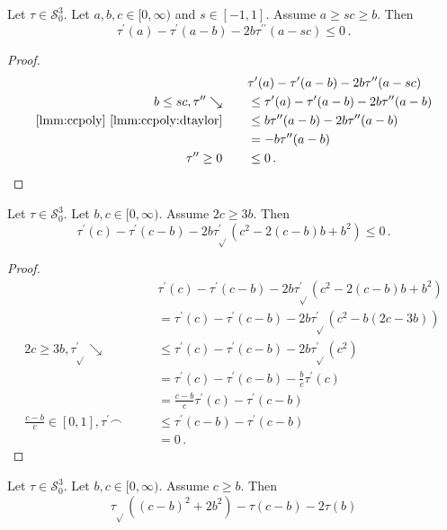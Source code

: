 \documentclass{article}
\newcommand*{\mc}[1]{\mathcal{#1}}
\newcommand{\Rp}{[0, \infty)} %
\newcommand{\pr}{^\prime}
\newcommand{\prr}{^{\prime\prime}}
\newcommand{\equationFullstop}{\, .}
\newcommand{\eqfs}{\equationFullstop}
\newcommand{\tran}{\tau}
\newcommand{\trans}{\tran_{\!\sqrt{}}}
\newcommand{\dtrans}{\trans\pr}
\newcommand{\dtran}{\tran\pr}
\newcommand{\ddtran}{\tran\prr}
\newcommand{\setccod}[1]{\mc S_0^{#1}}
\newcommand{\decr}{\searrow}
\newcommand{\posi}{\geq0}
\newcommand{\conc}{\smallfrown}
\begin{document}
\begin{appendix}
\begin{lemma}
	Let $\tran\in\setccod3$.
	Let $a,b,c\in\Rp$ and $s\in[-1,1]$.
	Assume $a \geq sc \geq b$.
	Then
	\begin{equation*}
		\dtran(a) - \dtran(a-b) - 2b \ddtran(a - sc)
		\leq
		0
		\eqfs
	\end{equation*}
\end{lemma}
%
\begin{proof}
	\begin{align*}
		&  
		\dtran(a) - \dtran(a-b) - 2b \ddtran(a - sc)
		\\
		b\leq sc, \ddtran\decr
		\qquad&\leq
		\dtran(a) - \dtran(a-b) - 2b \ddtran(a - b)
		\\
		\text{\cref{lmm:ccpoly} \ref{lmm:ccpoly:dtaylor}}
		\qquad&\leq
		b \ddtran(a - b) - 2b \ddtran(a - b)
		\\
		\qquad&=
		-b \ddtran(a - b) 
		\\
		\ddtran\posi
		\qquad&\leq
		0
		\eqfs
	\end{align*}
\end{proof}
%
%
%
\begin{lemma}\label{mech:10}
	Let $\tran\in\setccod3$.
	Let $b,c\in\Rp$.
	Assume $2c\geq3b$.
	Then
	\begin{equation*}
		\dtran(c) - \dtran(c-b) - 2b \dtrans(c^2 - 2 (c-b) b + b^2) 
		\leq
		0
		\eqfs
	\end{equation*}
\end{lemma}
%
\begin{proof}
	\begin{align*}
		&\dtran(c) - \dtran(c-b) - 2b \dtrans(c^2 - 2 (c-b) b + b^2)
		\\
		\qquad&=
		\dtran(c)- \dtran(c-b) - 2b \dtrans(c^2 - b (2c-3b))
		\\
		2c\geq3b, \dtrans\decr
		\qquad&\leq
		\dtran(c)- \dtran(c-b) - 2b \dtrans(c^2)
		\\
		\qquad&=
		\dtran(c)- \dtran(c-b) - \frac bc \dtran(c)
		\\
		\qquad&=
		\frac{c-b}{c}\dtran(c) - \dtran(c-b)
		\\
		\frac{c-b}{c}\in[0,1], \dtran\conc
		\qquad&\leq
		\dtran(c-b) - \dtran(c-b)
		\\
		\qquad&=
		0
		\eqfs
	\end{align*}
\end{proof}
%
%
%
\begin{lemma}\label{mech:11}
	Let $\tran\in\setccod3$.
	Let $b,c\in\Rp$.
	Assume $c\geq b$.
	Then
	\begin{equation*}
		\trans((c-b)^2 + 2 b^2) - \tran(c-b) - 2\tran(b) 

\end{equation*}
\end{lemma}
\end{appendix}
\end{document}
